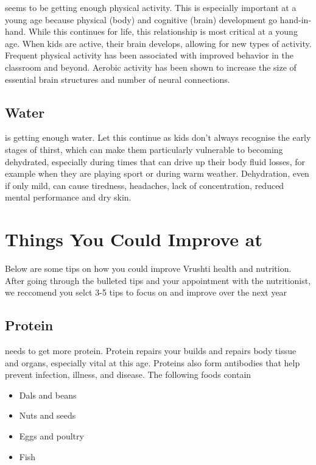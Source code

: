 \documentclass[]{article}
\begin{document}
seems to be getting enough physical activity. This is especially
important at a young age because physical (body) and cognitive (brain)
development go hand-in-hand. While this continues for life, this
relationship is most critical at a young age. When kids are active,
their brain develops, allowing for new types of activity. Frequent
physical activity has been associated with improved behavior in the
classroom and beyond. Aerobic activity has been shown to increase the
size of essential brain structures and number of neural connections.

\subsection{Water}\label{water}

is getting enough water. Let this continue as kids don't always
recognise the early stages of thirst, which can make them particularly
vulnerable to becoming dehydrated, especially during times that can
drive up their body fluid losses, for example when they are playing
sport or during warm weather. Dehydration, even if only mild, can cause
tiredness, headaches, lack of concentration, reduced mental performance
and dry skin.

\newpage

\section{Things You Could Improve at}\label{things-you-could-improve-at}

Below are some tips on how you could improve Vrushti health and
nutrition. After going through the bulleted tips and your appointment
with the nutritionist, we reccomend you selct 3-5 tips to focus on and
improve over the next year

\subsection{Protein}\label{protein}

needs to get more protein. Protein repairs your builds and repairs body
tissue and organs, especially vital at this age. Proteins also form
antibodies that help prevent infection, illness, and disease. The
following foods contain

\begin{itemize}
\item
  Dals and beans
\item
  Nuts and seeds
\item
  Eggs and poultry
\item
  Fish
\end{itemize}
\end{document}
